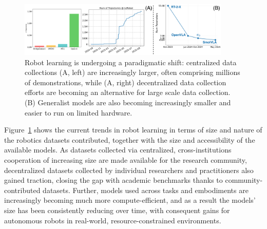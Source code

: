 \begin{figure}
    \centering
    \includegraphics[width=0.9\textwidth]{figures/ch5/ch5-trends.pdf}
    \caption{Robot learning is undergoing a paradigmatic shift: centralized data collections (A, left) are increasingly larger, often comprising millions of demonstrations, while (A, right) decentralized data collection efforts are becoming an alternative for large scale data collection. (B) Generalist models are also becoming increasingly smaller and easier to run on limited hardware.}
    \label{fig:ch5-trends}
\end{figure}

Figure~\ref{fig:ch5-trends} shows the current trends in robot learning in terms of size and nature of the robotics datasets contributed, together with the size and accessibility of the available models.
As datasets collected via centralized, cross-institutions cooperation of increasing size are made available for the research community, decentralized datasets collected by individual researchers and practitioners also gained traction, closing the gap with academic benchmarks thanks to community-contributed datasets.
Further, models used across tasks and embodiments are increasingly becoming much more compute-efficient, and as a result the models' size has been consistently reducing over time, with consequent gains for autonomous robots in real-world, resource-constrained environments.

